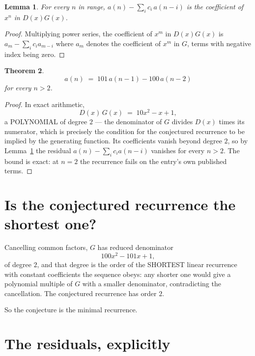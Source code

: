 \documentclass[11pt,a4paper]{article}
\theoremstyle{plain}
\newtheorem{theorem}{Theorem}
\newtheorem{lemma}[theorem]{Lemma}
\theoremstyle{definition}
\begin{document}
\begin{lemma}\label{lem:key}
For every $n$ in range, $a(n)-\sum_i c_i\,a(n-i)$ is the coefficient of $x^{n}$ in
$D(x)G(x)$.
\end{lemma}

\begin{proof}
Multiplying power series, the coefficient of $x^{m}$ in $D(x)G(x)$ is
$a_m-\sum_i c_i a_{m-i}$ where $a_m$ denotes the coefficient of $x^{m}$ in $G$, terms with
negative index being zero.
\end{proof}

\begin{theorem}
\[
a(n)\;=\;101\,a(n-1) - 100\,a(n-2)
\]
for every $n>2$.
\end{theorem}

\begin{proof}
In exact arithmetic,
\[
D(x)\,G(x)\;=\;10 x^{2} - x + 1,
\]
a POLYNOMIAL of degree $2$ --- the denominator of $G$ divides $D(x)$ times its numerator,
which is precisely the condition for the conjectured recurrence to be implied by the
generating function. Its coefficients vanish beyond degree $2$, so by
Lemma~\ref{lem:key} the residual $a(n)-\sum_ic_ia(n-i)$ vanishes for every
$n>2$. The bound is exact: at $n=2$ the recurrence fails on the entry's own published terms.
\end{proof}

\section{Is the conjectured recurrence the shortest one?}

Cancelling common factors, $G$ has reduced denominator
\[
100 x^{2} - 101 x + 1,
\]
of degree $2$, and that degree is the order of the SHORTEST linear recurrence with
constant coefficients the sequence obeys: any shorter one would give a polynomial multiple of
$G$ with a smaller denominator, contradicting the cancellation. The conjectured recurrence has
order $2$.

So the conjecture is the minimal recurrence.

\section{The residuals, explicitly}
\end{document}
